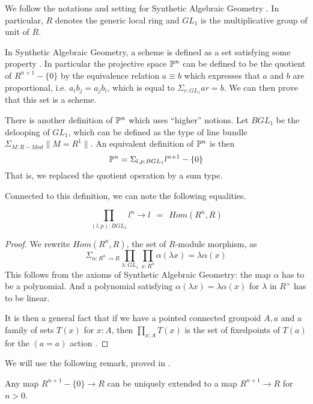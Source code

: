 We follow the notations and setting for Synthetic Algebraic Geometry \cite{draft}.
In particular, $R$ denotes the generic
local ring and $GL_1$ is the multiplicative group of unit of $R$.

In Synthetic Algebraic Geometry, a scheme is defined as a set satisfying some property \cite{draft}. In particular
the projective space $\mathbb{P}^n$ can be defined to be the quotient of $R^{n+1}-\{0\}$ by the
equivalence relation $a\equiv b$ which expresses that $a$ and $b$ are proportional, i.e.
$a_ib_j=a_jb_i$, which is equal to $\Sigma_{r:GL_1}ar = b$. We can then prove \cite{draft}
that this set is a scheme.

There is another definition of $\mathbb{P}^n$ which uses ``higher'' notions. Let $BGL_1$ be the delooping
of $GL_1$, which can be defined as the type of line bundle $\Sigma_{M:R-Mod}\|{M=R^1}\|$.
An equivalent definition of $\mathbb{P}^n$ is then \cite{Sym}
$$
\mathbb{P}^n = \Sigma_{l,p:BGL_1}l^{n+1}-\{0\}
$$
That is, we replaced the quotient operation by a sum type.

\medskip

Connected to this definition, we can note the following equalities.

\begin{proposition}\label{end}
  $$\prod_{(l,p):BGL_1}l^n\rightarrow l ~~=~~ Hom(R^n,R)$$
\end{proposition}

\begin{proof}
We rewrite $Hom(R^n,R)$, the set of $R$-module morphism, as
$$
\Sigma_{\alpha:R^n\rightarrow R}\prod_{\lambda:GL_1}\prod_{x:R^n}\alpha(\lambda x) = \lambda \alpha(x)
$$
This follows from the axioms of Synthetic Algebraic Geometry: the map $\alpha$ has to be a polynomial. And a polynomial
satisfying $\alpha(\lambda x) = \lambda \alpha(x)$ for $\lambda$ in $R^{\times}$ has to be linear.

\medskip

It is then a general fact that if we have a pointed connected groupoid $A,a$ and a family of
sets $T(x)$ for $x:A$, then $\prod_{x:A}T(x)$ is the set of fixedpoints of $T(a)$ for the $(a=a)$ action
\cite{Sym}.
\end{proof}

We will use the following remark, proved in \cite{draft}.

\begin{lemma}\label{ext}
  Any map $R^{n+1}-\{0\}\rightarrow R$ can be uniquely extended to a map $R^{n+1}\rightarrow R$ for $n>0$.
\end{lemma}

